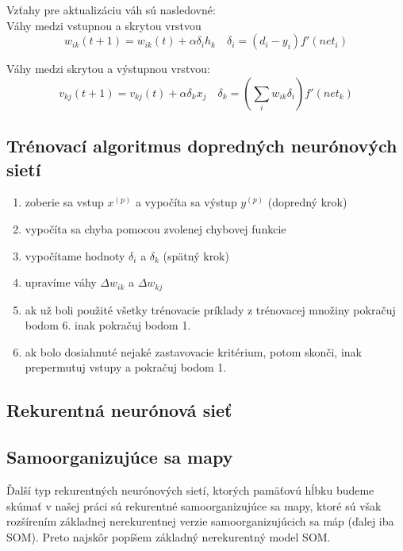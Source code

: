 Vzťahy pre aktualizáciu váh sú nasledovné: \\

Váhy medzi vstupnou a skrytou vrstvou
\begin{equation}
	w_{ik}(t+1) = w_{ik}(t) + \alpha\delta_{i}h_{k} \quad \delta_{i} = (d_i - y_i)f'(net_{i})
\end{equation}

Váhy medzi skrytou a výstupnou vrstvou: 
\begin{equation}
	v_{kj}(t+1) = v_{kj}(t) + \alpha\delta_{k}x_{j} \quad \delta_{k} = (\sum_{i} w_{ik}\delta_{i})f'(net_{k})
\end{equation}

\subsection{Trénovací algoritmus dopredných neurónových sietí}
\begin{enumerate}
	\item zoberie sa vstup $x^{(p)}$ a vypočíta sa výstup $y^{(p)}$ (dopredný krok)
	\item vypočíta sa chyba pomocou zvolenej chybovej funkcie
	\item vypočítame hodnoty $\delta_{i}$ a $\delta_{k}$  (spätný krok)
	\item upravíme váhy $\Delta w_{ik}$ a $\Delta w_{kj}$
	\item ak už boli použité všetky trénovacie príklady z trénovacej množiny pokračuj bodom 6. inak pokračuj bodom 1.
	\item ak bolo dosiahnuté nejaké zastavovacie kritérium, potom skonči, inak prepermutuj vstupy a pokračuj bodom 1.
\end{enumerate}


\subsection{Rekurentná neurónová sieť}
 



\subsection{Samoorganizujúce sa mapy}
Ďalší typ rekurentných neurónových sietí, ktorých pamäťovú hĺbku budeme skúmať v našej práci sú rekurentné samoorganizujúce sa mapy, 
ktoré sú však rozšírením základnej nerekurentnej verzie samoorganizujúcich sa máp (ďalej iba SOM). 
Preto najskôr popíšem základný nerekurentný model SOM.

